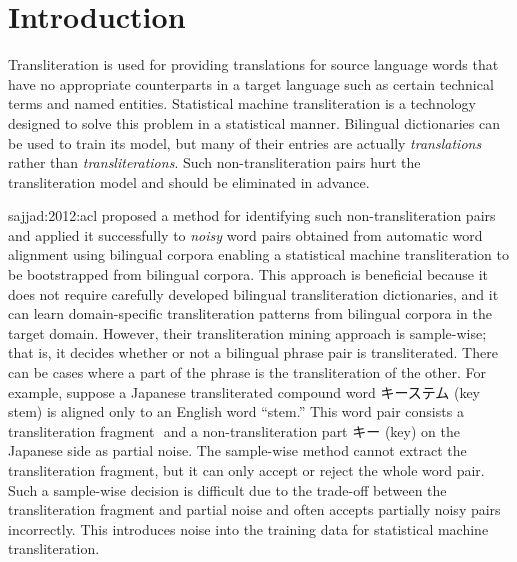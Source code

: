 \documentclass[english]{jnlp_1.4}
\def\pair#1#2{}
\newcommand{\newcite}{}
\begin{document}
\maketitle

\section{Introduction}

Transliteration is used for providing translations for source language words
that have no appropriate counterparts in a target language
such as certain technical terms and named entities.
Statistical machine transliteration \cite{knight:1998:cl} is a technology
designed to solve this problem in a statistical manner.
Bilingual dictionaries can be used to train its model,
but many of their entries are actually {\em translations} rather than {\em transliterations}.
Such non-transliteration pairs hurt the transliteration model and should be eliminated in advance.

\newcite{sajjad:2012:acl} proposed a method for identifying such non-transliteration pairs
and applied it successfully to {\em noisy} word pairs obtained from automatic word alignment using bilingual corpora
enabling a statistical machine transliteration to be bootstrapped from bilingual corpora.
This approach is beneficial because it does not require carefully developed bilingual transliteration dictionaries,
and it can learn domain-specific transliteration patterns from bilingual corpora in the target domain.
However, their transliteration mining approach is sample-wise;
that is, it decides whether or not a bilingual phrase pair is transliterated.
There can be cases where a part of the phrase is the transliteration of the other.
For example, suppose a Japanese transliterated compound word キーステム (key stem)
is aligned only to an English word ``stem.''
This word pair consists a transliteration fragment $\pair{\text{ステム (stem)}}{\text{stem}}$
and a non-transliteration part キー (key) on the Japanese side as partial noise.
The sample-wise method cannot extract the transliteration fragment,
but it can only accept or reject the whole word pair.
Such a sample-wise decision is difficult due to the trade-off between the transliteration fragment and partial noise
and often accepts partially noisy pairs incorrectly.
This introduces noise into the training data for statistical machine transliteration.
\end{document}
